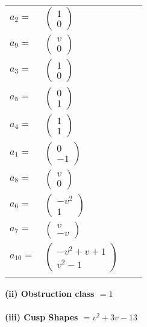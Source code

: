 \documentclass[1p]{elsarticle_modified}
\theoremstyle{definition}
\begin{document}
\begin{tabular}{m{7pt} m{180pt} m{7pt} m{180pt} }
\flushright $a_{2}=$&$\begin{pmatrix}1\\0\end{pmatrix}$ \\
\flushright $a_{9}=$&$\begin{pmatrix}v\\0\end{pmatrix}$ \\
\flushright $a_{3}=$&$\begin{pmatrix}1\\0\end{pmatrix}$ \\
\flushright $a_{5}=$&$\begin{pmatrix}0\\1\end{pmatrix}$ \\
\flushright $a_{4}=$&$\begin{pmatrix}1\\1\end{pmatrix}$ \\
\flushright $a_{1}=$&$\begin{pmatrix}0\\-1\end{pmatrix}$ \\
\flushright $a_{8}=$&$\begin{pmatrix}v\\0\end{pmatrix}$ \\
\flushright $a_{6}=$&$\begin{pmatrix}- v^2\\1\end{pmatrix}$ \\
\flushright $a_{7}=$&$\begin{pmatrix}v\\- v\end{pmatrix}$ \\
\flushright $a_{10}=$&$\begin{pmatrix}- v^2+v+1\\v^2-1\end{pmatrix}$\\&\end{tabular}
\flushleft \textbf{(ii) Obstruction class $= 1$}\\~\\
\flushleft \textbf{(iii) Cusp Shapes $= v^2+3 v-13$}\\~\\
\end{document}
